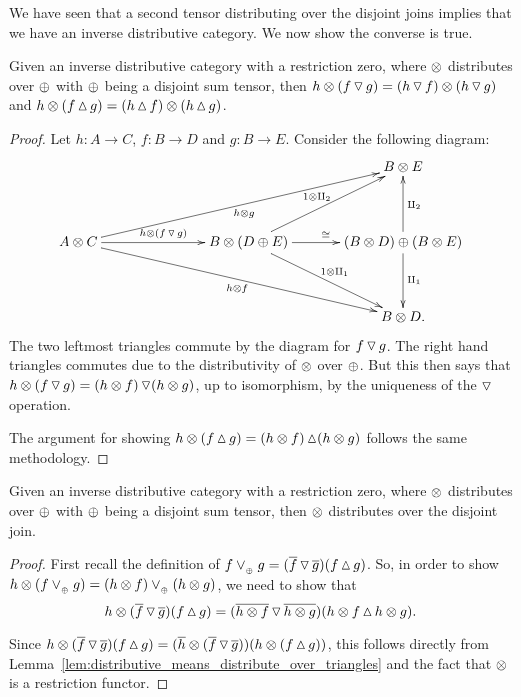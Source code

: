 We have seen that a second tensor distributing over the disjoint joins implies that we have an
inverse distributive category. We now show the converse is true.
\begin{lemma}\label{lem:distributive_means_distribute_over_triangles}
  Given an inverse distributive category \X with a restriction zero, where $\otimes$ distributes over
  $\oplus$ with $\oplus$ being a disjoint sum tensor, then $h\otimes(f\operatorname{\triangledown} g) = (h\operatorname{\triangledown} f) \otimes (h\operatorname{\triangledown} g)$
  and $h\otimes(f\operatorname{\vartriangle} g) = (h\operatorname{\vartriangle} f) \otimes (h\operatorname{\vartriangle} g)$.
\end{lemma}
\begin{proof}
  Let $h:A \to C$, $f:B \to D$ and $g: B \to E$. Consider the following diagram:
  \[
    \xymatrix@R+15pt@C+10pt{
      & && B\*E\\
      A\*C \ar[rr]^{h\*(f\tjleft g)} \ar[drrr]_{h\*f} \ar[urrr]_{h\*g}
        && B \* (D \+ E) \ar[r]^{\cong} \ar[dr]^{1\*\cpa} \ar[ur]^{1\*\cpb}
        & (B\*D) \+ (B \* E) \ar[d]^{\cpa} \ar[u]_{\cpb}\\
      & && B\*D.
    }
  \]
  The two leftmost  triangles commute by the diagram for $f\operatorname{\triangledown} g$. The right hand triangles
  commutes due to the distributivity of $\otimes$ over $\oplus$. But this then says that
  $h\otimes(f\operatorname{\triangledown} g) = (h\otimes f)\operatorname{\triangledown}(h\otimes g)$, up to isomorphism, by the uniqueness of the
  $\operatorname{\triangledown}$ operation.

  The argument for showing $h\otimes(f\operatorname{\vartriangle} g) = (h\otimes f)\operatorname{\vartriangle}(h\otimes g)$ follows the same methodology.
\end{proof}
\begin{lemma}\label{lem:distributive_means_distribute_over_join}
  Given an inverse distributive category \X with a restriction zero, where $\otimes$ distributes over
  $\oplus$ with $\oplus$ being a disjoint sum tensor, then $\otimes$ distributes over the disjoint join.
\end{lemma}
\begin{proof}
  First recall the definition of $f\vee_{{_{\oplus}}} g = (\overline{f}\operatorname{\triangledown}\overline{g})(f\operatorname{\vartriangle} g)$. So, in order
  to show $h\otimes(f\vee_{{_{\oplus}}} g) = (h\otimes f)\vee_{{_{\oplus}}} (h\otimes g)$, we need to show that
  \begin{equation}
    h\otimes(\overline{f}\operatorname{\triangledown}\overline{g})(f\operatorname{\vartriangle} g) = (\overline{h\otimes f}\operatorname{\triangledown}\overline{h\otimes g})(h\otimes f\operatorname{\vartriangle} h\otimes g).
    \label{eq:distribute_over_left_right}
  \end{equation}

  Since $h\otimes(\overline{f}\operatorname{\triangledown}\overline{g})(f\operatorname{\vartriangle} g) =
  (\overline{h}\otimes(\overline{f}\operatorname{\triangledown}\overline{g}))(h\otimes(f\operatorname{\vartriangle} g))$, this follows directly from
  Lemma~\ref{lem:distributive_means_distribute_over_triangles} and the fact that $\otimes$ is a
  restriction functor.
\end{proof}

